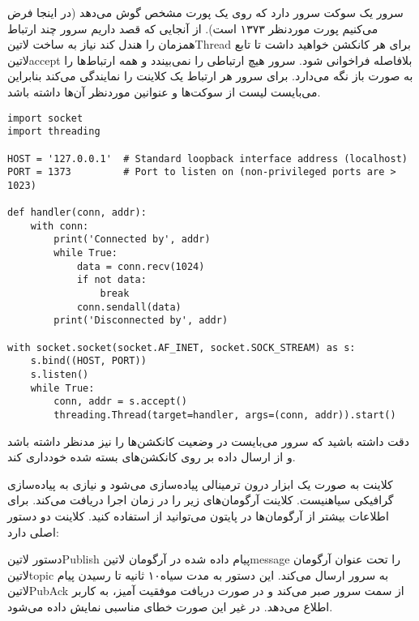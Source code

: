 \documentclass[]{article}
\begin{document}

  سرور یک سوکت سرور دارد که روی یک پورت مشخص گوش می‌دهد (در اینجا فرض می‌کنیم پورت موردنظر ۱۳۷۳ است). از آنجایی که قصد داریم سرور چند ارتباط همزمان را هندل کند نیاز به ساخت ‌لاتین{Thread} برای هر کانکشن خواهید داشت
  تا تابع ‌لاتین{accept} بلافاصله فراخوانی شود. سرور هیچ ارتباطی را نمی‌بیندد و همه ارتباط‌ها را به صورت باز نگه می‌دارد. برای سرور هر ارتباط یک کلاینت را نمایندگی می‌کند بنابراین می‌بایست لیست از سوکت‌ها و عنوانین موردنظر آن‌ها داشته باشد.

  \begin{latin}
  \begin{verbatim}
import socket
import threading

HOST = '127.0.0.1'  # Standard loopback interface address (localhost)
PORT = 1373         # Port to listen on (non-privileged ports are > 1023)

def handler(conn, addr):
    with conn:
        print('Connected by', addr)
        while True:
            data = conn.recv(1024)
            if not data:
                break
            conn.sendall(data)
        print('Disconnected by', addr)

with socket.socket(socket.AF_INET, socket.SOCK_STREAM) as s:
    s.bind((HOST, PORT))
    s.listen()
    while True:
        conn, addr = s.accept()
        threading.Thread(target=handler, args=(conn, addr)).start()
  \end{verbatim}
  \end{latin}

  دقت داشته باشید که سرور می‌بایست در وضعیت کانکشن‌ها را نیز مدنظر داشته باشد و از ارسال داده بر روی کانکشن‌های بسته شده خودداری کند.


  کلاینت به صورت یک ابزار درون ترمینالی پیاده‌سازی می‌شود و نیازی به پیاده‌سازی گرافیکی ‌سیاه{نیست}.
  کلاینت آرگومان‌های زیر را در زمان اجرا دریافت می‌کند. برای اطلاعات بیشتر از آرگومان‌ها در پایتون می‌توانید از  استفاده کنید.
  کلاینت دو دستور اصلی دارد:

  دستور ‌لاتین{Publish} پیام داده شده در آرگومان ‌لاتین{message} را تحت عنوان آرگومان ‌لاتین{topic} به سرور ارسال می‌کند.
  این دستور به مدت ‌سیاه{۱۰ ثانیه} تا رسیدن پیام ‌لاتین{PubAck} از سمت سرور صبر می‌کند و در صورت دریافت موفقیت آمیز، به کاربر اطلاع می‌دهد.
  در غیر این صورت خطای مناسبی نمایش داده می‌شود.
\end{document}
